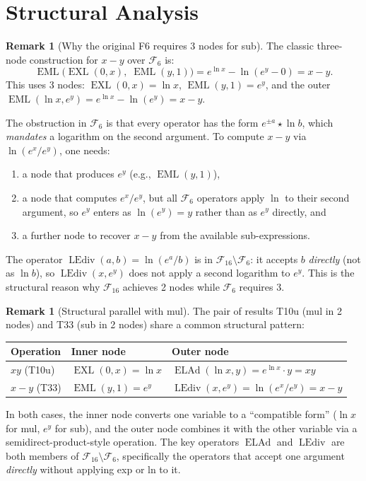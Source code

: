 \documentclass[12pt,a4paper]{article}
\theoremstyle{definition}
\newtheorem{remark}[theorem]{Remark}
\newcommand{\EML}{\operatorname{EML}}
\newcommand{\EXL}{\operatorname{EXL}}
\newcommand{\ELAd}{\operatorname{ELAd}}
\newcommand{\LEdiv}{\operatorname{LEdiv}}
\begin{document}
\section{Structural Analysis}

\begin{remark}[Why the original F6 requires 3 nodes for sub]\label{rem:F6}
The classic three-node construction for $x-y$ over $\mathcal{F}_6$ is:
\[
  \EML\!\bigl(\EXL(0,x),\;\EML(y,1)\bigr)
  = e^{\ln x} - \ln(e^y - 0)
  = x - y.
\]
This uses 3 nodes: $\EXL(0,x)=\ln x$, $\EML(y,1)=e^y$, and the outer
$\EML(\ln x, e^y) = e^{\ln x} - \ln(e^y) = x - y$.

The obstruction in $\mathcal{F}_6$ is that every operator has the form
$e^{\pm a}\star\ln b$, which \emph{mandates} a logarithm on the second
argument.  To compute $x-y$ via $\ln(e^x/e^y)$, one needs:
\begin{enumerate}
  \item a node that produces $e^y$ (e.g., $\EML(y,1)$),
  \item a node that computes $e^x / e^y$, but all $\mathcal{F}_6$ operators
        apply $\ln$ to their second argument, so $e^y$ enters as $\ln(e^y)=y$
        rather than as $e^y$ directly, and
  \item a further node to recover $x-y$ from the available sub-expressions.
\end{enumerate}

The operator $\LEdiv(a,b) = \ln(e^a/b)$ is in $\mathcal{F}_{16}\setminus\mathcal{F}_6$:
it accepts $b$ \emph{directly} (not as $\ln b$), so $\LEdiv(x, e^y)$ does not
apply a second logarithm to $e^y$.  This is the structural reason why
$\mathcal{F}_{16}$ achieves 2 nodes while $\mathcal{F}_6$ requires 3.
\end{remark}

\begin{remark}[Structural parallel with mul]\label{rem:parallel}
The pair of results T10u (mul in 2 nodes) and T33 (sub in 2 nodes) share a
common structural pattern:

\smallskip
\begin{tabular}{@{}lll@{}}
\toprule
Operation & Inner node & Outer node \\
\midrule
$xy$ (T10u) & $\EXL(0,x) = \ln x$ & $\ELAd(\ln x, y) = e^{\ln x}\cdot y = xy$ \\
$x-y$ (T33) & $\EML(y,1) = e^y$ & $\LEdiv(x, e^y) = \ln(e^x/e^y) = x-y$ \\
\bottomrule
\end{tabular}
\smallskip

In both cases, the inner node converts one variable to a ``compatible form''
($\ln x$ for mul, $e^y$ for sub), and the outer node combines it with the
other variable via a semidirect-product-style operation.
The key operators $\ELAd$ and $\LEdiv$ are both members of $\mathcal{F}_{16}
\setminus\mathcal{F}_6$, specifically the operators that accept one argument
\emph{directly} without applying exp or ln to it.
\end{remark}
\end{document}
